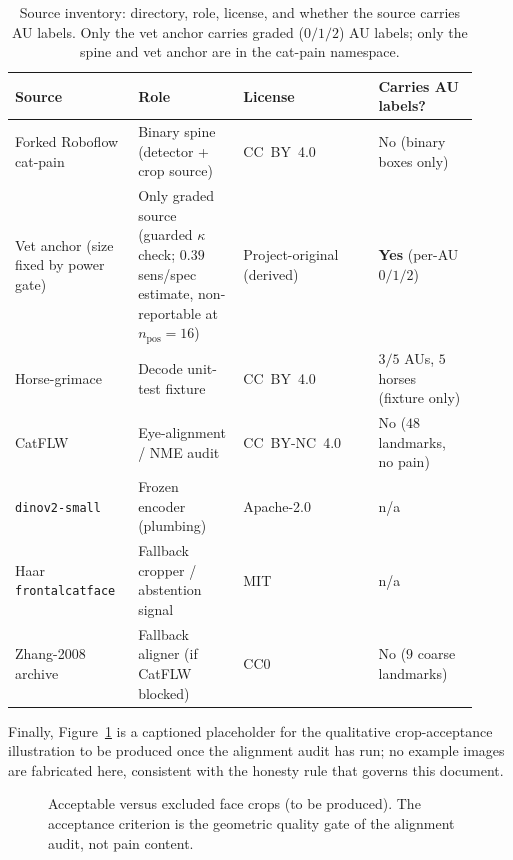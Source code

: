 \begin{table}[t]
\centering
\caption[Source inventory and namespacing]{Source inventory: directory, role,
license, and whether the source carries AU labels. Only the vet anchor carries
graded ($0/1/2$) AU labels; only the spine and vet anchor are in the cat-pain
namespace.}
\label{tab:inventory}
\small
\begin{tabular}{@{}p{0.24\linewidth}p{0.21\linewidth}p{0.27\linewidth}p{0.20\linewidth}@{}}
\toprule
\textbf{Source} & \textbf{Role} & \textbf{License} & \textbf{Carries AU labels?} \\
\midrule
Forked Roboflow cat-pain & Binary spine (detector + crop source) & CC~BY~4.0 &
No (binary boxes only) \\
\addlinespace
Vet anchor (size fixed by power gate) & Only graded source (guarded $\kappa$ check; $0.39$ sens/spec estimate, non-reportable at $n_{\text{pos}}{=}16$) &
Project-original (derived) & \textbf{Yes} (per-AU $0/1/2$) \\
\addlinespace
Horse-grimace & Decode unit-test fixture & CC~BY~4.0 &
$3/5$ AUs, $5$ horses (fixture only) \\
\addlinespace
CatFLW & Eye-alignment / NME audit & CC~BY-NC~4.0 &
No ($48$ landmarks, no pain) \\
\addlinespace
\texttt{dinov2-small} & Frozen encoder (plumbing) & Apache-2.0 & n/a \\
\addlinespace
Haar \texttt{frontalcatface} & Fallback cropper / abstention signal & MIT & n/a \\
\addlinespace
Zhang-2008 archive & Fallback aligner (if CatFLW blocked) & CC0 &
No ($9$ coarse landmarks) \\
\bottomrule
\end{tabular}
\end{table}

Finally, Figure~\ref{fig:crops} is a captioned placeholder for the qualitative
crop-acceptance illustration to be produced once the alignment audit has run; no
example images are fabricated here, consistent with the honesty rule that
governs this document.

\begin{figure}[t]
\centering
{}
\caption[Acceptable versus excluded crops (placeholder)]{Acceptable versus
excluded face crops (to be produced). The acceptance criterion is the geometric
quality gate of the alignment audit, not pain content.}
\label{fig:crops}
\end{figure}
